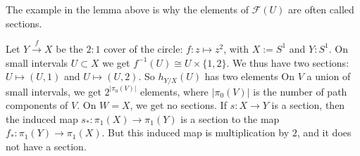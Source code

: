 The example in the lemma above is why the elements of $\mathcal{F}(U)$ are often called sections. 

\begin{exmp}
    Let $Y \xrightarrow{f} X$ be the $2:1$ cover of the circle: $f: z \mapsto z^2$, with $X := S^1$ and $Y: S^1$. 
    On small intervals $U \subset X$ we get $f^{-1}(U)  \cong U \times \{1,2\}$. We thus have two sections: $U \mapsto (U, 1)$ and $U \mapsto (U, 2)$. So $h_{Y/X}(U)$ has two elements
    On $V$ a union of small intervals, we get $2^{|\pi_0(V)|}$ elements, where $|\pi_0(V)|$ is the number of path components of $V$. 
    On $W = X$, we get no sections. If $s: X \to Y$ is a section, then the induced map $s_*: \pi_1(X) \to \pi_1(Y)$ is a section to the map $f_*: \pi_1(Y) \to \pi_1(X)$. But this induced map is multiplication by $2$, and it does not have a section. 
\end{exmp}